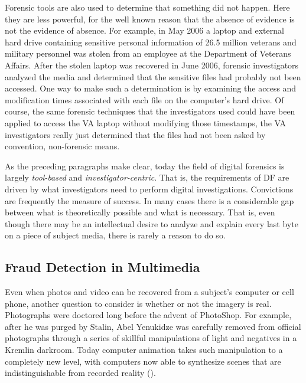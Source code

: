 Forensic tools are also used to determine that something did not
happen. Here they are less powerful, for the well known reason that
the absence of evidence is not the evidence of absence. 
For example, in May 2006 a laptop and external hard drive containing
sensitive personal information of 26.5 million veterans and military
personnel was stolen from an employee at the Department of Veterans
Affairs. After the stolen laptop was recovered in June 2006, forensic
investigators analyzed the media and determined that the sensitive
files had probably not been accessed\cite{va-laptop-1}. One way to
make such a determination is by examining the access and modification
times associated with each file on the computer's hard
drive. Of course, the same
forensic techniques that the investigators used could have been
applied to access the VA laptop without modifying those timestamps,
the VA investigators really just determined that the files had not
been asked by convention, non-forensic means.

As the preceding paragraphs make clear, today the field of digital
forensics is largely \emph{tool-based} and
\emph{investigator-centric}. 
That is, the requirements of DF are driven 
by what investigators need to perform digital
investigations\citep{walls-levine-effective-digital-forensics}. Convictions
are frequently the
measure of success. In many cases there is a considerable gap between
what is theoretically possible and what is necessary. That is, even
though there may be an intellectual desire to analyze and explain every last byte
on a piece of subject media\cite{garfinkel:every-last-byte}, there is
rarely a reason to do so.

\subsection{Fraud Detection in Multimedia}

Even when photos and video can be recovered from a subject's computer
or cell phone, another question to consider is whether or not the
imagery is real. Photographs were doctored long before the advent of
PhotoShop. For example, after he was purged by Stalin, Abel
Yenukidze was carefully removed from official photographs through a
series of skillful manipulations of light and negatives in a Kremlin darkroom\citet{stalins-darkroom}. Today
computer animation takes such manipulation to a completely new level,
with computers now able to synthesize scenes that are 
indistinguishable from recorded reality (). 

